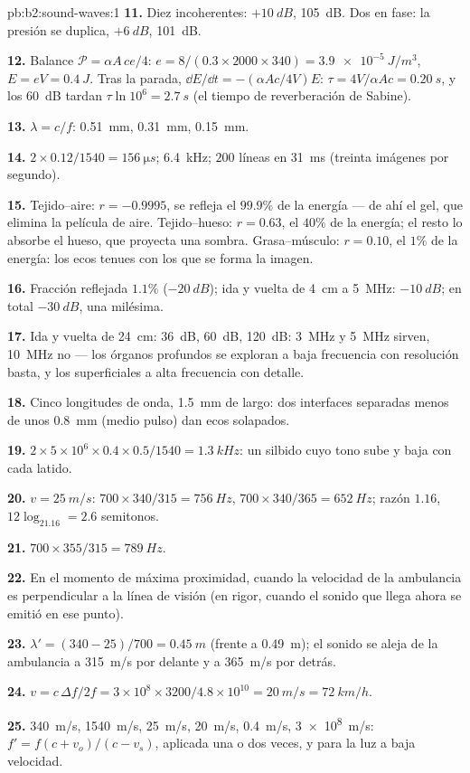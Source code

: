 \begin{solution}{pb:b2:sound-waves:1}
\textbf{11.} Diez incoherentes: $+\qty{10}{dB}$, \qty{105}{dB}. Dos en fase:
la presión se duplica, $+\qty{6}{dB}$, \qty{101}{dB}.

\textbf{12.} Balance $\mathcal P = \alpha A\,ce/4$: $e = 8/(0.3 \times 2000 \times 340) =
\qty{3.9e-5}{J/m^3}$, $E = eV = \qty{0.4}{J}$. Tras la parada, $\dd E/\dd t = -(\alpha Ac
/4V)E$: $\tau = 4V/\alpha Ac = \qty{0.20}{s}$, y los \qty{60}{dB} tardan $\tau\ln10^6 =
\qty{2.7}{s}$ (el tiempo de reverberación de Sabine).

\textbf{13.} $\lambda = c/f$: \qty{0.51}{mm}, \qty{0.31}{mm}, \qty{0.15}{mm}.

\textbf{14.} $2 \times 0.12/1540 = \qty{156}{\micro s}$; \qty{6.4}{kHz}; $200$ líneas en
\qty{31}{ms} (treinta imágenes por segundo).

\textbf{15.} Tejido--aire: $r = -0.9995$, se refleja el $99.9\%$ de la
energía --- de ahí el gel, que elimina la película de aire.
Tejido--hueso: $r = 0.63$, el $40\%$ de la energía; el resto lo absorbe el
hueso, que proyecta una sombra. Grasa--músculo: $r = 0.10$, el $1\%$ de la
energía: los ecos tenues con los que se forma la imagen.

\textbf{16.} Fracción reflejada $1.1\%$ ($-\qty{20}{dB}$); ida y vuelta de
\qty{4}{cm} a \qty{5}{MHz}: $-\qty{10}{dB}$; en total $-\qty{30}{dB}$, una milésima.

\textbf{17.} Ida y vuelta de \qty{24}{cm}: \qty{36}{dB}, \qty{60}{dB}, \qty{120}{dB}: \qty{3}{MHz}
y \qty{5}{MHz} sirven, \qty{10}{MHz} no --- los órganos profundos se
exploran a baja frecuencia con resolución basta, y los superficiales a
alta frecuencia con detalle.

\textbf{18.} Cinco longitudes de onda, \qty{1.5}{mm} de largo: dos
interfaces separadas menos de unos \qty{0.8}{mm} (medio pulso) dan ecos
solapados.

\textbf{19.} $2 \times 5 \times 10^6 \times 0.4 \times 0.5/1540 = \qty{1.3}{kHz}$: un silbido cuyo
tono sube y baja con cada latido.

\textbf{20.} $v = \qty{25}{m/s}$: $700 \times 340/315 = \qty{756}{Hz}$, $700 \times 340/365 =
\qty{652}{Hz}$; razón $1.16$, $12\log_21.16 = 2.6$ semitonos.

\textbf{21.} $700 \times 355/315 = \qty{789}{Hz}$.

\textbf{22.} En el momento de máxima proximidad, cuando la velocidad de la
ambulancia es perpendicular a la línea de visión (en rigor, cuando el
sonido que llega ahora se emitió en ese punto).

\textbf{23.} $\lambda' = (340 - 25)/700 = \qty{0.45}{m}$ (frente a \qty{0.49}{m}); el
sonido se aleja de la ambulancia a \qty{315}{m/s} por delante y a \qty{365}{m/s}
por detrás.

\textbf{24.} $v = c\,\Delta f/2f = 3 \times 10^8 \times 3200/4.8 \times 10^{10} = \qty{20}{m/s} =
\qty{72}{km/h}$.

\textbf{25.} \qty{340}{m/s}, \qty{1540}{m/s}, \qty{25}{m/s}, \qty{20}{m/s}, \qty{0.4}{m/s},
\qty{3e8}{m/s}: $f' = f(c + v_o)/(c - v_s)$, aplicada una o dos veces, y para
la luz a baja velocidad.
\end{solution}
